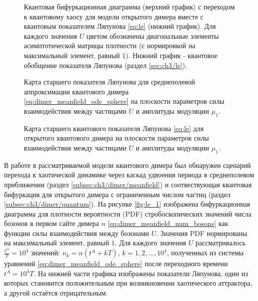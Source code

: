 \begin{figure}[ht]
	\centerfloat{
		\texttt{[image: le\_2]}
	}
	\caption[Квантовая бифуркационная диаграмма с переходом к квантовому хаосу для модели открытого димера вместе с квантовым показателем Ляпунова]{
		Квантовая бифуркационная диаграмма (верхний график) с переходом к квантовому хаосу для модели открытого димера вместе с квантовым показателем Ляпунова \cref{eq:le} (нижний график). 
		Для каждого значения $U$ цветом обозначены диагональные элементы асимптотической матрицы плотности (с нормировкой на максимальный элемент, равный $1$). Нижний график - квантовое обобщение показателя Ляпунова (раздел \cref{sec:ch3/le}).
	}
	\label{fig:le_2}
\end{figure}

\begin{figure}[ht]
	\centerfloat{
		\texttt{[image: le\_3]}
	}
	\caption[Карта старшего показателя Ляпунова для среднеполевой аппроксимации квантового димера на плоскости параметров силы взаимодействия между частицами и амплитуды модуляции]{
		Карта старшего показателя Ляпунова для среднеполевой аппроксимации квантового димера \cref{eq:dimer_meanfield_ode_sphere} на плоскости параметров силы взаимодействия между частицами $U$ и амплитуды модуляции $\mu_1$.
	}
	\label{fig:le_3}
\end{figure}

\begin{figure}[ht]
	\centerfloat{
		\texttt{[image: le\_4]}
	}
	\caption[Карта старшего квантового показателя Ляпунова для открытого квантового димера на плоскости параметров силы взаимодействия между частицами и амплитуды модуляции]{
		Карта старшего квантового показателя Ляпунова \cref{eq:le} для открытого квантового димера на плоскости параметров силы взаимодействия между частицами $U$ и амплитуды модуляции $\mu_1$.
	}
	\label{fig:le_4}
\end{figure}

В работе \cite{Ivanchenko2017} в рассматриваемой модели квантового димера был обнаружен сценарий перехода к хаотической динамике через каскад удвоения периода в среднеполевом приближении (раздел \cref{subsec:ch3/dimer/meanfield}) и соотвествующая квантовая бифуркация для открытого димера с ограниченным числом частиц (раздел \cref{subsec:ch3/dimer/quantum}). 
На рисунке \cref{fig:le_1} изображена бифуркационная диаграмма для плотности вероятности (PDF) стробоскопических значений числа бозонов в первом сайте димера $n$ \cref{eq:dimer_meanfield_num_bosons} как функции силы взаимодействия между бозонами $U$.
Значения PDF нормированы на максимальный элемент, равный $1$.
Для каждого значения $U$ рассматривалось  $\frac{t^O}{T} = 10^4 $ значений: $n_k = n(t^A + kT)$, $k = 1,2, \ldots, 10^4$, полученных из системы уравнений \cref{eq:dimer_meanfield_ode_sphere} после переходного времени $t^A = 10^4 T$.
На нижней части графика изображены показатели Ляпунова, один из которых становится положительным при возникновении хаотического аттрактора, а другой остаётся отрицательным.

